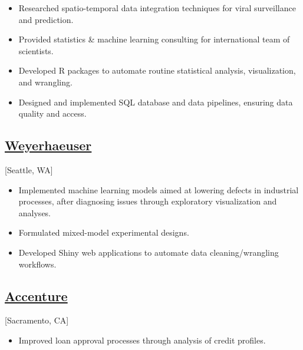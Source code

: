 \documentclass{wm_cv}
\begin{document}
\begin{itemize}
  \item Researched spatio-temporal data integration techniques for viral surveillance and prediction.
  \item Provided statistics \& machine learning consulting for international team of scientists.
  \item Developed R packages to automate routine statistical analysis, visualization, and wrangling.
  \item Designed and implemented SQL database and data pipelines, ensuring data quality and access.
\end{itemize}


\subsection{\href{https://en.wikipedia.org/wiki/Weyerhaeuser}{Weyerhaeuser}}[Seattle, WA]
\begin{positions}
\end{positions}

\begin{itemize}
  \item Implemented machine learning models aimed at lowering defects in industrial processes, after diagnosing issues through exploratory visualization and analyses.
  \item Formulated mixed-model experimental designs.
  \item Developed Shiny web applications to automate data cleaning/wrangling workflows.
\end{itemize} 

\subsection{\href{https://en.wikipedia.org/wiki/Accenture}{Accenture}}[Sacramento, CA]
\begin{positions}
\end{positions}

\begin{itemize}
  \item Improved loan approval processes through analysis of credit profiles. 
\end{itemize}


\end{document}
